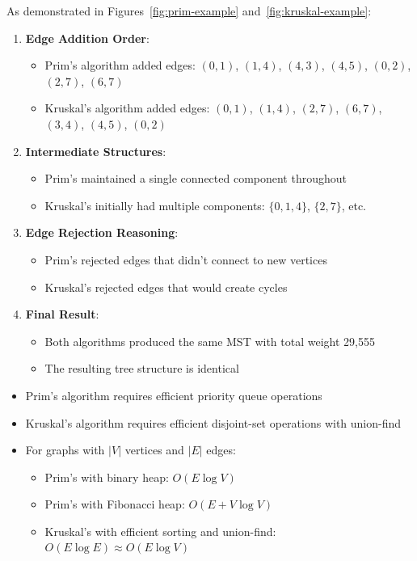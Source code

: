 \documentclass{article}
\theoremstyle{definition}
\begin{document}
As demonstrated in Figures~\ref{fig:prim-example} and~\ref{fig:kruskal-example}:

\begin{enumerate}
\item \textbf{Edge Addition Order}:
   \begin{itemize}
   \item Prim's algorithm added edges: $(0,1)$, $(1,4)$, $(4,3)$, $(4,5)$, $(0,2)$, $(2,7)$, $(6,7)$
   \item Kruskal's algorithm added edges: $(0,1)$, $(1,4)$, $(2,7)$, $(6,7)$, $(3,4)$, $(4,5)$, $(0,2)$
   \end{itemize}

\item \textbf{Intermediate Structures}:
   \begin{itemize}
   \item Prim's maintained a single connected component throughout
   \item Kruskal's initially had multiple components: $\{0,1,4\}$, $\{2,7\}$, etc.
   \end{itemize}

\item \textbf{Edge Rejection Reasoning}:
   \begin{itemize}
   \item Prim's rejected edges that didn't connect to new vertices
   \item Kruskal's rejected edges that would create cycles
   \end{itemize}

\item \textbf{Final Result}:
   \begin{itemize}
   \item Both algorithms produced the same MST with total weight 29,555
   \item The resulting tree structure is identical
   \end{itemize}
\end{enumerate}

\begin{itemize}
\item Prim's algorithm requires efficient priority queue operations
\item Kruskal's algorithm requires efficient disjoint-set operations with union-find
\item For graphs with $|V|$ vertices and $|E|$ edges:
  \begin{itemize}
  \item Prim's with binary heap: $O(E \log V)$
  \item Prim's with Fibonacci heap: $O(E + V \log V)$
  \item Kruskal's with efficient sorting and union-find: $O(E \log E) \approx O(E \log V)$
  \end{itemize}
\end{itemize}
\end{document}
